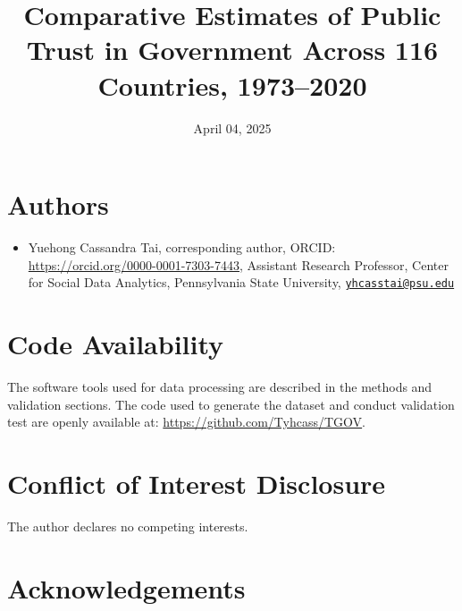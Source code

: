 \documentclass[
  12pt,
]{article}
\title{Comparative Estimates of Public Trust in Government Across 116 Countries, 1973--2020}
\author{}
\date{\vspace{-2.5em}April 04, 2025}
\providecommand{\tightlist}{%
  \setlength{\itemsep}{0pt}\setlength{\parskip}{0pt}}
\begin{document}
\maketitle


\section*{Authors}\label{authors}

\begin{itemize}
\tightlist
\item
  Yuehong Cassandra Tai, corresponding author, ORCID: \url{https://orcid.org/0000-0001-7303-7443}, Assistant Research Professor, Center for Social Data Analytics, Pennsylvania State University, \href{mailto:yhcasstai@psu.edu}{\nolinkurl{yhcasstai@psu.edu}}
\end{itemize}

\section{Code Availability}\label{code-availability}

The software tools used for data processing are described in the methods and validation sections.
The code used to generate the dataset and conduct validation test are openly available at: \url{https://github.com/Tyhcass/TGOV}.

\section{Conflict of Interest Disclosure}\label{conflict-of-interest-disclosure}

The author declares no competing interests.

\section{Acknowledgements}\label{acknowledgements}

\pagebreak

\renewcommand{\baselinestretch}{1}
\selectfont
\maketitle
\renewcommand{\baselinestretch}{1.5}
\selectfont
\end{document}
